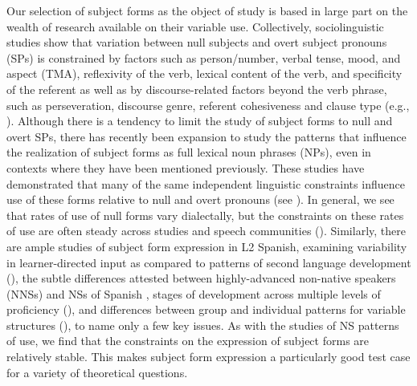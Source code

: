 \documentclass[output=paper]{langscibook}
\begin{document}
Our selection of subject forms as the object of study is based in large part on the wealth of research available on their variable use. Collectively, sociolinguistic studies show that variation between null subjects and overt subject pronouns (SPs) is constrained by factors such as person/number, verbal tense, mood, and aspect (TMA), reflexivity of the verb, lexical content of the verb, and specificity of the referent as well as by discourse-related factors beyond the verb phrase, such as perseveration, discourse genre, referent cohesiveness and clause type  (e.g., \citealt{CarvalhoShin2015, OtheguyLivert2007, ShinOtheguy2009, Silva-Corvalán1994, TravisCacoullos2012}). Although there is a tendency to limit the study of subject forms to null and overt SPs, there has recently been expansion to study the patterns that influence the realization of subject forms as full lexical noun phrases (NPs), even in contexts where they have been mentioned previously. These studies have demonstrated that many of the same independent linguistic constraints influence use of these forms relative to null and overt pronouns (see \citealt{Bentivoglio1993, Dumont2006, GudmestadGeeslin2022, GudmestadGeeslin2013, Silva-Corvalán2015}). In general, we see that rates of use of null forms vary dialectally, but the constraints on these rates of use are often steady across studies and speech communities (\citealt{CarvalhoShin2015, GudmestadGeeslin2022}). Similarly, there are ample studies of subject form expression in L2 Spanish, examining variability in learner-directed input as compared to patterns of second language development (\citealt{Gurzynski-Weiss2018}), the subtle differences attested between highly-advanced non-native speakers (NNSs) and NSs of Spanish \citep{GeeslinGudmestad2011,GeeslinGudmestad2016}, stages of development across multiple levels of proficiency (\citealt{GeeslinLinfordFafulas2015}), and differences between group and individual patterns for variable structures (\citealt{GeeslinEtAl2013}), to name only a few key issues. As with the studies of NS patterns of use, we find that the constraints on the expression of subject forms are relatively stable. This makes subject form expression a particularly good test case for a variety of theoretical questions.
\end{document}
